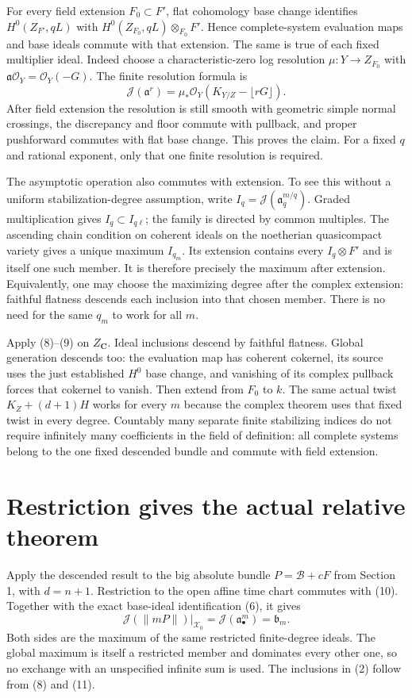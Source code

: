 \documentclass[10pt]{article}
\newcommand{\J}{\mathcal J}
\newcommand{\OO}{\mathcal O}
\begin{document}
For every field extension $F_0\subset F'$, flat cohomology base change
\cite{stacks} identifies $H^0(Z_{F'},qL)$ with
$H^0(Z_{F_0},qL)\otimes_{F_0}F'$. Hence complete-system evaluation
maps and base ideals commute with that extension. The same is true
of each fixed multiplier ideal. Indeed choose a characteristic-zero
log resolution $\mu:Y\to Z_{F_0}$ with
$\mathfrak a\OO_Y=\OO_Y(-G)$. The finite resolution formula is
\[
 \J(\mathfrak a^r)
    =\mu_*\OO_Y(K_{Y/Z}-\lfloor rG\rfloor).              \tag{10}
\]
After field extension the resolution is still smooth with geometric
simple normal crossings, the discrepancy and floor commute with
pullback, and proper pushforward commutes with flat base change.
This proves the claim. For a fixed $q$ and rational exponent, only
that one finite resolution is required.

The asymptotic operation also commutes with extension. To see this
without a uniform stabilization-degree assumption, write
$I_q=\J(\mathfrak a_q^{m/q})$. Graded multiplication gives
$I_q\subset I_{q\ell}$; the family is directed by common multiples.
The ascending chain condition on coherent ideals on the noetherian
quasicompact variety gives a unique maximum $I_{q_m}$. Its extension
contains every $I_q\otimes F'$ and is itself one such member.
It is therefore precisely the maximum after extension. Equivalently,
one may choose the maximizing degree after the complex extension:
faithful flatness descends each inclusion into that chosen member.
There is no need for the same $q_m$ to work for all $m$.

Apply (8)--(9) on $Z_{\mathbf C}$. Ideal inclusions descend by faithful
flatness. Global generation descends too: the evaluation map has
coherent cokernel, its source uses the just established $H^0$ base
change, and vanishing of its complex pullback forces that cokernel
to vanish. Then extend from $F_0$ to $k$. The same actual twist
$K_Z+(d+1)H$ works for every $m$ because the complex theorem uses
that fixed twist in every degree. Countably many separate finite
stabilizing indices do not require infinitely many coefficients
in the field of definition: all complete systems belong to the one
fixed descended bundle and commute with field extension.

\section{Restriction gives the actual relative theorem}
Apply the descended result to the big absolute bundle
$P=\mathcal B+cF$ from Section 1, with $d=n+1$.
Restriction to the open affine time chart commutes with (10).
Together with the exact base-ideal identification (6), it gives
\[
 \J(\|mP\|)|_{\mathcal X_0}
                      =\J(\mathfrak a_\bullet^m)=\mathfrak b_m.
                                                               \tag{11}
\]
Both sides are the maximum of the same restricted finite-degree
ideals. The global maximum is itself a restricted member and
dominates every other one, so no exchange with an unspecified
infinite sum is used. The inclusions in (2) follow from (8) and (11).
\end{document}
